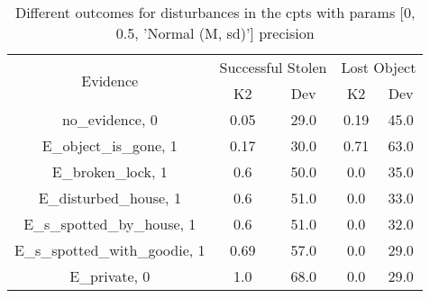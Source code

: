 \begin{table}\begin{tabular}{c|cc|cc}\toprule\multirow{2}{*}{Evidence} & \multicolumn{2}{c}{Successful Stolen} & \multicolumn{2}{c}{Lost Object} \\& {K2} & {Dev} & {K2} & {Dev} \\\midrule
no\_evidence, 0 & \cellcolor{Bittersweet}0.05&\cellcolor{Bittersweet}29.0&\cellcolor{Bittersweet}0.19&\cellcolor{Bittersweet}45.0\\E\_object\_is\_gone, 1 & \cellcolor{Bittersweet}0.17&\cellcolor{Bittersweet}30.0&\cellcolor{Bittersweet}0.71&\cellcolor{Bittersweet}63.0\\E\_broken\_lock, 1 & \cellcolor{Bittersweet}0.6&\cellcolor{Bittersweet}50.0&\cellcolor{Bittersweet}0.0&\cellcolor{Bittersweet}35.0\\E\_disturbed\_house, 1 & \cellcolor{Bittersweet}0.6&\cellcolor{Bittersweet}51.0&\cellcolor{Bittersweet}0.0&\cellcolor{Bittersweet}33.0\\E\_s\_spotted\_by\_house, 1 & \cellcolor{Bittersweet}0.6&\cellcolor{Bittersweet}51.0&\cellcolor{Bittersweet}0.0&\cellcolor{Bittersweet}32.0\\E\_s\_spotted\_with\_goodie, 1 & \cellcolor{Bittersweet}0.69&\cellcolor{Bittersweet}57.0&\cellcolor{Bittersweet}0.0&\cellcolor{Bittersweet}29.0\\E\_private, 0 & \cellcolor{Bittersweet}1.0&\cellcolor{Bittersweet}68.0&\cellcolor{Bittersweet}0.0&\cellcolor{Bittersweet}29.0\\\bottomrule\end{tabular}\caption{Different outcomes for disturbances in the cpts with params [0, 0.5, 'Normal (M, sd)'] precision}\end{table}